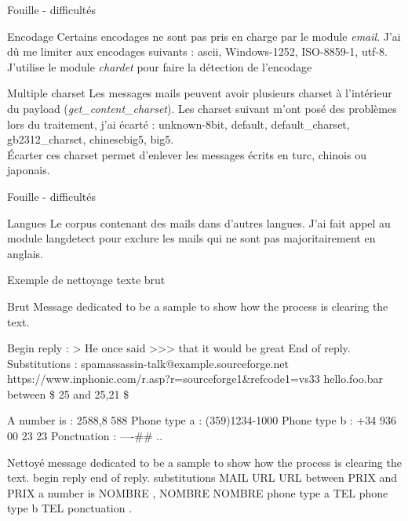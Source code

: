 \documentclass[xelatex,11pt, xcolor=dvipsnames]{beamer}
\begin{document}
\begin{frame}{Fouille - difficultés}
	\begin{block}{Encodage}
		Certains encodages ne sont pas pris en charge par le module \emph{email}.
		J'ai dû me limiter aux encodages suivants : ascii, Windows-1252, ISO-8859-1, utf-8.\\
		J'utilise le module \emph{chardet} pour faire la détection de l'encodage
	\end{block}

	\begin{block}{Multiple charset}
		Les messages mails peuvent avoir plusieurs charset à l'intérieur du payload (\emph{get\_content\_charset}).
		Les charset suivant m'ont posé des problèmes lors du traitement, j'ai écarté : unknown-8bit, default, default\_charset, gb2312\_charset, chinesebig5, big5.\\
		Écarter ces charset permet d'enlever les messages écrits en turc, chinois ou japonais.
	\end{block}
\end{frame}

\begin{frame}{Fouille - difficultés}
	\begin{block}{Langues}
		Le corpus contenant des mails dans d'autres langues.
		J'ai fait appel au module langdetect pour exclure les mails qui ne sont pas majoritairement en anglais.
	\end{block}
\end{frame}


\begin{frame}{Exemple de nettoyage texte brut}
	\begin{block}{Brut}
Message dedicated to be a sample to show how the process is clearing the text.

Begin reply :
> He once said
>>> that it would be great
End of reply.
Substitutions :
spamassassin-talk@example.sourceforge.net
https://www.inphonic.com/r.asp?r=sourceforge1\&refcode1=vs33
hello.foo.bar
between \$ 25 and 25,21 \$

A number is : 2588,8 588
Phone type a : (359)1234-1000
Phone type b : +34 936 00 23 23
Ponctuation : ----\#\# ..
	\end{block}
		
	\begin{block}{Nettoyé}
message dedicated to be a sample to show how the process is clearing the text. begin reply end of reply. substitutions MAIL URL URL between PRIX and PRIX a number is NOMBRE , NOMBRE NOMBRE phone type a TEL phone type b TEL ponctuation . 
	\end{block}

\end{frame}
\end{document}

